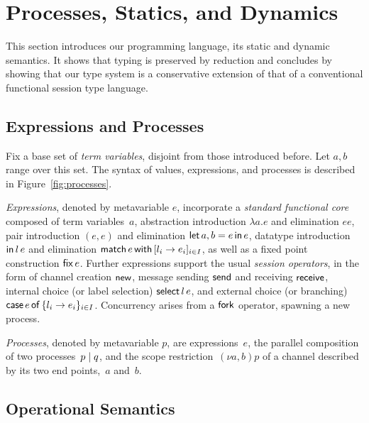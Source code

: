 \section{Processes, Statics, and Dynamics}
\label{sec:processes}

This section introduces our programming language, its static and
dynamic semantics. It shows that typing is preserved by reduction and
concludes by showing that our type system is a conservative extension
of that of a conventional functional session type language.

\subsection{Expressions and Processes}


 
Fix a base set of \emph{term variables}, disjoint from those
introduced before. Let $a,b$ range over this set.
%
The syntax of values, expressions, and processes is described in
Figure~\ref{fig:processes}.

\emph{Expressions}, denoted by metavariable $e$, incorporate a
\emph{standard functional core} composed of term variables~$a$,
abstraction introduction $\lambda a.e$ and elimination $ee$, pair
introduction $(e,e)$ and elimination $\mathsf{let}\,{a,b}={e}\,\mathsf{in}\,{e}$, datatype
introduction $\mathsf{in}{\,{l}\,{e}}$ and elimination
$\mathsf{match}\,{e}\,\mathsf{with}\,[{l_i\rightarrow e_i}]_{i\in I}$, as well as a fixed point
construction $\mathsf{fix}\,e$.
%
Further expressions support the usual \emph{session operators}, in the
form of channel creation $\mathsf{new}$, message sending $\mathsf{send}$ and
receiving $\mathsf{receive}$, internal choice (or label selection) $\mathsf{select}{\,{l}\,{e}}$,
and external choice (or branching)
$\mathsf{case}\,{e}\,\mathsf{of}\,{\{l_i\rightarrow e_i\}_{i\in I}}$.
%
Concurrency arises from a $\mathsf{fork}$ operator, spawning
a new process.
%

\emph{Processes}, denoted by metavariable $p$, are expressions~$e$,
the parallel composition of two processes~$p\mid q$, and the scope
restriction~$(\nu a,b)p$ of a channel described by its two end
points,~$a$ and~$b$.

\subsection{Operational Semantics}
\label{sec:semantics}

